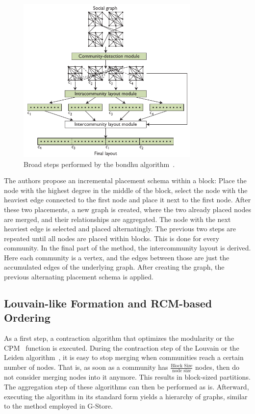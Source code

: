     \begin{figure}[htp]
        \begin{center}
            \includegraphics[keepaspectratio,width=0.8\textwidth]{img/06-rel_w/bondhu.png}
        \end{center}
        \caption{Broad steps performed by the bondhu algorithm~\autocite{hoque2012disk}.} 
        \label{bondhu-fig}
    \end{figure}

    The authors propose an incremental placement schema within a block:
    Place the node with the highest degree in the middle of the block, select the node with the heaviest edge connected to the first node and place it next to the first node. 
    After these two placements, a new graph is created, where the two already placed nodes are merged, and their relationships are aggregated. 
    The node with the next heaviest edge is selected and placed alternatingly. The previous two steps are repeated until all nodes are placed within blocks.
    This is done for every community.
    In the final part of the method, the intercommunity layout is derived. 
    Here each community is a vertex, and the edges between those are just the accumulated edges of the underlying graph. 
    After creating the graph, the previous alternating placement schema is applied.
    
    \subsection*{Louvain-like Formation and RCM-based Ordering}
        As a first step, a contraction algorithm that optimizes the modularity or the CPM~\autocite{traag2011narrow, potts1952some} function is executed.
        During the contraction step of the Louvain or the Leiden algorithm~\autocite{traag2019louvain}, it is easy to stop merging when communities reach a certain number of nodes.
        That is, as soon as a community has $\frac{\text{Block Size}}{\text{node size}}$ nodes, then do not consider merging nodes into it anymore.
        This results in block-sized partitions.
        The aggregation step of these algorithms can then be performed as is. 
        Afterward, executing the algorithm in its standard form yields a hierarchy of graphs, similar to the method employed in G-Store.
    
